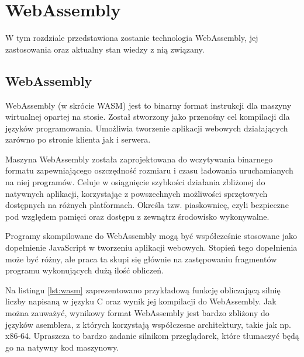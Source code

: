 \documentclass[language=polish,type=master]{aghmodern}
\begin{document}
\chapter{WebAssembly}
W tym rozdziale przedstawiona zostanie technologia WebAssembly, jej zastosowania oraz aktualny stan wiedzy z nią związany.

\section{WebAssembly}
WebAssembly (w skrócie WASM) jest to binarny format instrukcji dla maszyny wirtualnej opartej na stosie.
Został stworzony jako przenośny cel kompilacji dla języków programowania\footnotemark{}.
Umożliwia tworzenie aplikacji webowych działających zarówno po stronie klienta jak i serwera.

Maszyna WebAssembly została zaprojektowana do wczytywania binarnego formatu zapewniającego oszczędność rozmiaru i czasu ładowania uruchamianych na niej programów.
Celuje w osiągnięcie szybkości działania zbliżonej do natywnych aplikacji, korzystając z powszechnych możliwości sprzętowych\footnotemark{} dostępnych na różnych platformach.
Określa tzw. piaskownicę\footnotemark{}, czyli bezpieczne pod względem pamięci oraz dostępu z zewnątrz środowisko wykonywalne.

Programy skompilowane do WebAssembly mogą być współcześnie stosowane jako dopełnienie JavaScript w tworzeniu aplikacji webowych.
Stopień tego dopełnienia może być różny, ale praca ta skupi się głównie na zastępowaniu fragmentów programu wykonujących dużą ilość obliczeń.

Na listingu \ref{lst:wasm} zaprezentowano przykładową funkcję obliczającą silnię liczby napisaną w języku C oraz wynik jej kompilacji do WebAssembly.
Jak można zauważyć, wynikowy format WebAssembly jest bardzo zbliżony do języków asemblera, z których korzystają współczesne architektury, takie jak np. x86-64.
Upraszcza to bardzo zadanie silnikom przeglądarek, które tłumaczyć będą go na natywny kod maszynowy.
\end{document}
